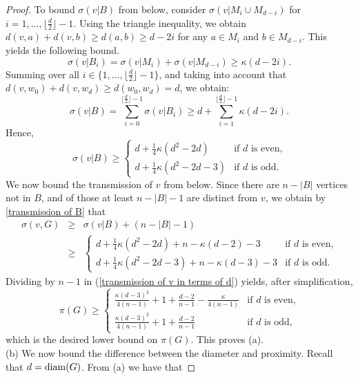 \documentclass[a4paper,11pt]{article}
\begin{document}
\begin{proof}
To bound \( \sigma(v|B) \) from below, consider \( \sigma(v|M_i \cup M_{d-i}) \) for \( i = 1, \ldots, \lfloor \frac{d}{2} \rfloor-1 \). Using the triangle inequality, we obtain 
\( d(v, a) + d(v, b) \geq d(a, b) \geq d - 2i \) for any \( a \in M_i \) and \( b \in M_{d-i} \). 
This yields the following bound.
\[
\sigma(v|B_i) = \sigma(v|M_i) + \sigma(v|M_{d-i}) \geq \kappa (d - 2i).
\]
Summing over all \( i \in \{1, \ldots, \lfloor \frac{d}{2} \rfloor -1\} \), and taking 
into account that $d(v,w_0) + d(v,w_d) \geq d(w_0,w_d) = d$, we obtain:
\[
\sigma(v|B) = \sum_{i=0}^{\lfloor \frac{d}{2} \rfloor -1} \sigma(v|B_i) 
  \geq d + \sum_{i=1}^{\lfloor \frac{d}{2} \rfloor -1} \kappa(d - 2i).
\]
Hence, 
\begin{equation}\label{transmission of B}
\sigma(v|B) \geq \left\{ \begin{array}{cc}
d+ \frac{1}{4} \kappa (d^2-2d) & \text{if $d$ is even,} \\
d+ \frac{1}{4}\kappa(d^2-2d-3) & \text{if $d$ is odd.}
\end{array} \right.
\end{equation}
We now bound the transmission of $v$ from below. Since there are $n-|B|$ vertices not in $B$,
and of those at least $n-|B|-1$ are distinct from $v$, we obtain by \eqref{transmission of B} that
\begin{eqnarray}
\sigma(v, G) & \geq &  \sigma(v|B) + (n-|B|-1) \nonumber \\
& \geq & \left\{ \begin{array}{cc}
d+ \frac{1}{4} \kappa (d^2-2d) + n - \kappa(d-2) -3 & \text{if $d$ is even,} \\
d+ \frac{1}{4}\kappa(d^2-2d-3) +n - \kappa(d-3) - 3 & \text{if $d$ is odd.}
\end{array} \right. \label{transmission of v in terms of d}
\end{eqnarray}
Dividing by \( n-1 \) in (\ref{transmission of v in terms of d}) yields, after simplification, 
\[
\pi(G) \geq \left\{ \begin{array}{cc} 
\frac{\kappa(d-3)^2}{4(n-1)} + 1 + \frac{d-2}{n-1} - \frac{\kappa}{4(n-1)}& \textrm{if $d$ is even,} \\
\frac{\kappa(d-3)^2}{4(n-1)} + 1 + \frac{d-2}{n-1} & \textrm{if $d$ is odd,} 
\end{array} \right. 
\]
which is the desired lower bound on $\pi(G)$. This proves (a). \\[2mm]
(b) We now bound the difference between the diameter and proximity. Recall that $d={\rm diam}(G)$. 
From (a) we have that

\end{proof}
\end{document}
